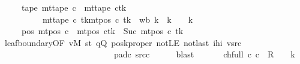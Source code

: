 \begin{isabellebody}
\ \ \ \ \ tape{}{\isacharcolon}{\kern0pt}\ {\isachardoublequoteopen}mt{\isacharunderscore}{\kern0pt}tape\ c{}\ {\isacharequal}{\kern0pt}\ {\isacharparenleft}{\kern0pt}mt{\isacharunderscore}{\kern0pt}tape\ c{}{\isacharparenright}{\kern0pt}{\isacharparenleft}{\kern0pt}tk\ {\isacharcolon}{\kern0pt}{\isacharequal}{\kern0pt}\isanewline
\ \ \ \ \ \ \ \ \ \ {\isacharparenleft}{\kern0pt}mt{\isacharunderscore}{\kern0pt}tape\ c{}\ tk{\isacharparenright}{\kern0pt}{\isacharparenleft}{\kern0pt}mt{\isacharunderscore}{\kern0pt}pos\ c{}\ tk\ {\isacharcolon}{\kern0pt}{\isacharequal}{\kern0pt}\ {\isacharquery}{\kern0pt}wb\ {\isacharparenleft}{\kern0pt}{\isacharquery}{\kern0pt}k\ {\isacharplus}{\kern0pt}\ {\isacharparenleft}{\kern0pt}{\isacharquery}{\kern0pt}k\ {\isacharminus}{\kern0pt}\ {}{\isacharparenright}{\kern0pt}\ {\isacharminus}{\kern0pt}\ {\isacharquery}{\kern0pt}k{\isacharparenright}{\kern0pt}{\isacharparenright}{\kern0pt}{\isacharparenright}{\kern0pt}{\isachardoublequoteclose}\isanewline
\ \ \ \ \ pos{}{\isacharcolon}{\kern0pt}\ {\isachardoublequoteopen}mt{\isacharunderscore}{\kern0pt}pos\ c{}\ {\isacharequal}{\kern0pt}\ {\isacharparenleft}{\kern0pt}mt{\isacharunderscore}{\kern0pt}pos\ c{}{\isacharparenright}{\kern0pt}{\isacharparenleft}{\kern0pt}tk\ {\isacharcolon}{\kern0pt}{\isacharequal}{\kern0pt}\ Suc\ {\isacharparenleft}{\kern0pt}mt{\isacharunderscore}{\kern0pt}pos\ c{}\ tk{\isacharparenright}{\kern0pt}{\isacharparenright}{\kern0pt}{\isachardoublequoteclose}\isanewline
\ \ \ \ \isamarkupfalse%
\ leaf{\isacharunderscore}{\kern0pt}boundary{\isacharbrackleft}{\kern0pt}OF\ vM\ st{}\ qQ\ poskproper\ notLE{}\ notlast\ ihi\ vsrc{}\isanewline
\ \ \ \ \ \ \ \ \ \ \ \ \ \ \ \ \ \ \ \ \ \ \ \ \ \ \ pad{\isacharunderscore}{\kern0pt}c{}\ src{\isacharunderscore}{\kern0pt}c{}{\isacharbrackright}{\kern0pt}\isanewline
\ \ \ \ \isamarkupfalse%
\ blast\isanewline
\ \ %
\isanewline
\ \ \isamarkupfalse%
\ ch{\isacharunderscore}{\kern0pt}full{\isacharcolon}{\kern0pt}\ {\isachardoublequoteopen}{\isacharparenleft}{\kern0pt}c{\isacharprime}{\kern0pt}{\isacharcomma}{\kern0pt}\ c{}{\isacharparenright}{\kern0pt}\ {\isasymin}\ {\isacharquery}{\kern0pt}R\ {\isacharcircum}{\kern0pt}{\isacharcircum}{\kern0pt}\ {\isacharparenleft}{\kern0pt}{}\ {\isacharasterisk}{\kern0pt}\ {\isacharquery}{\kern0pt}k{\isacharparenright}{\kern0pt}{\isachardoublequoteclose}\isanewline

\end{isabellebody}
